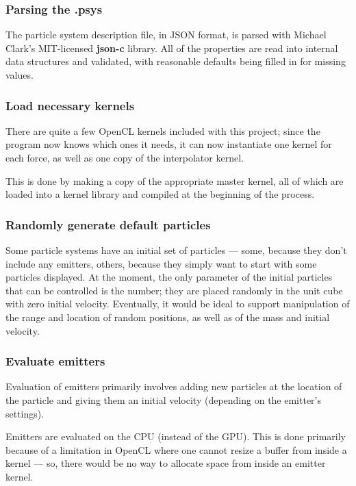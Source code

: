 \documentclass{acmsiggraph}
\begin{document}
\subsubsection{Parsing the .psys}

The particle system description file, in JSON format, is parsed with Michael Clark's MIT-licensed {\bf json-c} library. All of the properties are read into internal data structures and validated, with reasonable defaults being filled in for missing values.

\subsubsection{Load necessary kernels}

There are quite a few OpenCL kernels included with this project; since the program now knows which ones it needs, it can now instantiate one kernel for each force, as well as one copy of the interpolator kernel.

This is done by making a copy of the appropriate master kernel, all of which are loaded into a kernel library and compiled at the beginning of the process.

\subsubsection{Randomly generate default particles}

Some particle systems have an initial set of particles --- some, because they don't include any emitters, others, because they simply want to start with some particles displayed. At the moment, the only parameter of the initial particles that can be controlled is the number; they are placed randomly in the unit cube with zero initial velocity. Eventually, it would be ideal to support manipulation of the range and location of random positions, as well as of the mass and initial velocity.

\subsubsection{Evaluate emitters}

\label{emitters}

Evaluation of emitters primarily involves adding new particles at the location of the particle and giving them an initial velocity (depending on the emitter's settings).

Emitters are evaluated on the CPU (instead of the GPU). This is done primarily because of a limitation in OpenCL where one cannot resize a buffer from inside a kernel --- so, there would be no way to allocate space from inside an emitter kernel.
\end{document}
